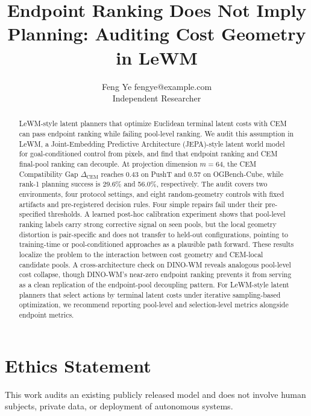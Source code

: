 \documentclass{article}
\title{Endpoint Ranking Does Not Imply Planning: Auditing Cost Geometry in LeWM}
\author{\name Feng Ye \email fengye@example.com \\
      \addr Independent Researcher}
\newcommand{\DeltaCEM}{\Delta_\text{CEM}}
\begin{document}
\maketitle

\begin{abstract}
LeWM-style latent planners that optimize Euclidean terminal latent costs with CEM can pass endpoint ranking while failing pool-level ranking. We audit this assumption in LeWM, a Joint-Embedding Predictive Architecture (JEPA)-style latent world model for goal-conditioned control from pixels, and find that endpoint ranking and CEM final-pool ranking can decouple. At projection dimension $m=64$, the CEM Compatibility Gap $\DeltaCEM$ reaches 0.43 on PushT and 0.57 on OGBench-Cube, while rank-1 planning success is 29.6\% and 56.0\%, respectively. The audit covers two environments, four protocol settings, and eight random-geometry controls with fixed artifacts and pre-registered decision rules. Four simple repairs fail under their pre-specified thresholds. A learned post-hoc calibration experiment shows that pool-level ranking labels carry strong corrective signal on seen pools, but the local geometry distortion is pair-specific and does not transfer to held-out configurations, pointing to training-time or pool-conditioned approaches as a plausible path forward. These results localize the problem to the interaction between cost geometry and CEM-local candidate pools. A cross-architecture check on DINO-WM reveals analogous pool-level cost collapse, though DINO-WM's near-zero endpoint ranking prevents it from serving as a clean replication of the endpoint-pool decoupling pattern. %
For LeWM-style latent planners that select actions by terminal latent costs under iterative sampling-based optimization, we recommend reporting pool-level and selection-level metrics alongside endpoint metrics.
\end{abstract}











\section*{Ethics Statement}
This work audits an existing publicly released model and does not involve human subjects, private data, or deployment of autonomous systems.
\end{document}
